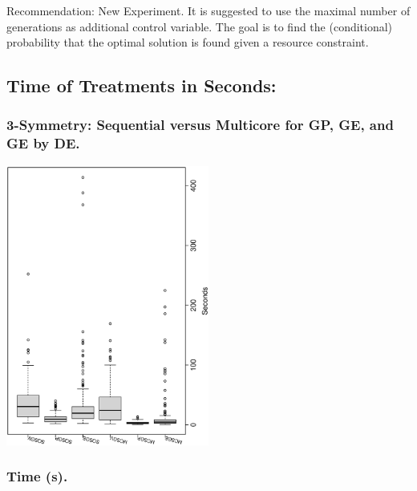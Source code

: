 \documentclass[18pt,c]{beamer}
\makeatletter
\let\beamer@writeslidentry@miniframeson=\beamer@writeslidentry
\newcommand*{\miniframeson}{\let\beamer@writeslidentry=\beamer@writeslidentry@miniframeson}
\makeatother
\begin{document}
\begin{frame}
\vspace*{2mm}
\begin{block}{
Recommendation: New Experiment.
}
It is suggested to use the maximal number of generations as additional control variable.
The goal is to find the (conditional) probability that the optimal solution is found
given a resource constraint.
\end{block}
\end{frame}%
\miniframeson
\subsection{Time of Treatments in Seconds: }
 \begin{frame}
 \frametitle{ 3-Symmetry: Sequential versus Multicore for GP, GE, and GE by DE.  }
 \begin{center}
\includegraphics[width=0.5\textwidth, angle=-90]
{ExpAboxplottSeconds000.eps}
 \end{center}
 \label{ExpAboxplottSeconds000.eps}  
 \end{frame}

 \begin{frame}
 \fontsize{8pt}{9pt}\selectfont
 \frametitle{ Time (s). }

 \label{ExpAStatsTable001.tex}  
 \end{frame}
\end{document}
